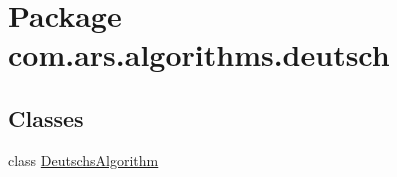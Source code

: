 \hypertarget{namespacecom_1_1ars_1_1algorithms_1_1deutsch}{}\section{Package com.\+ars.\+algorithms.\+deutsch}
\label{namespacecom_1_1ars_1_1algorithms_1_1deutsch}
\subsection*{Classes}
\begin{DoxyCompactItemize}
\item 
class \hyperlink{classcom_1_1ars_1_1algorithms_1_1deutsch_1_1_deutschs_algorithm}{Deutschs\+Algorithm}
\end{DoxyCompactItemize}
